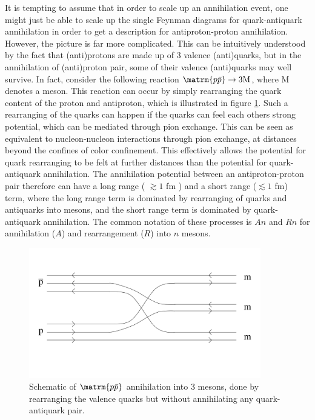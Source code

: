 It is tempting to assume that in order to scale up an annihilation event, one might just be able to scale up the single Feynman diagrams for quark-antiquark annihilation in order to get a description for antiproton-proton annihilation. However, the picture is far more complicated. This can be intuitively understood by the fact that (anti)protons are made up of 3 valence (anti)quarks, but in the annihilation of (anti)proton pair, some of their valence (anti)quarks may well survive. In fact, consider the following reaction $\matrm{p\bar{p}} \rightarrow 3 \mathrm{M}$, where M denotes a meson. This reaction can occur by simply rearranging the quark content of the proton and antiproton, which is illustrated in figure \ref{fig:Quark_Rearrangement}. Such a rearranging of the quarks can happen if the quarks can feel each others strong potential, which can be mediated through pion exchange. This can be seen as equivalent to nucleon-nucleon interactions through pion exchange, at distances beyond the confines of color confinement. This effectively allows the potential for quark rearranging to be felt at further distances than the potential for quark-antiquark annihilation. The annihilation potential between an antiproton-proton pair therefore can have a long range ( $\gtrsim 1$ fm ) and a short range ($\lesssim 1$ fm) term, where the long range term is dominated by rearranging of quarks and antiquarks into mesons, and the short range term is dominated by quark-antiquark annihilation. The common notation of these processes is $An$ and $Rn$ for annihilation ($A$) and rearrangement ($R$) into $n$ mesons.\\

\begin{figure}[h!]
    \centering
    \includegraphics[width=0.9\textwidth]{figures/quark_rearrangment.pdf}
    \caption{Schematic of $\matrm{p\bar{p}}$ annihilation into 3 mesons, done by rearranging the valence quarks but without annihilating any quark-antiquark pair.}
    \label{fig:Quark_Rearrangement}
\end{figure}

